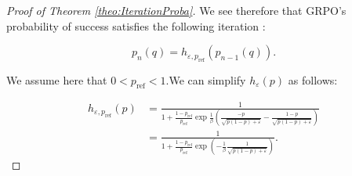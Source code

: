 \documentclass[11pt,reqno]{amsart}
\begin{document}
\begin{proof} [Proof of Theorem \ref{theo:IterationProba}]
\noindent We see therefore that GRPO's probability of success satisfies the following iteration : 

\[ p_{n} (q) = h_{\varepsilon,p_{\mathrm{ref}}}(p_{n-1}(q)) . \]

\noindent We assume here that $0<p_{\mathrm{ref}}<1$.We can simplify $h_{\varepsilon} (p)$ as follows: 


\begin{align*}
h_{\varepsilon,p_{\mathrm{ref}}}(p)  &= \frac{1}{1+ \frac{1-p_{\mathrm{ref}}}{p_{\mathrm{ref}}} \exp \frac{1}{\beta} \left(  \frac{-p }{\sqrt{p(1-p) + \varepsilon}} -  \frac{1-p }{\sqrt{p(1-p) + \varepsilon}} \right)  }\\
& = \frac{1}{1+ \frac{1-p_{\mathrm{ref}}}{p_{\mathrm{ref}}} \exp \left(-\frac{1}{\beta}  \frac{1}{\sqrt{p(1-p) + \varepsilon}}\right) }.
\end{align*}
\end{proof}
\end{document}
